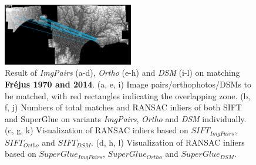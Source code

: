 \begin{figure}[htbp]
\begin{center}
{\begin{minipage}[t]{0.48\linewidth}
				\centering
				\includegraphics[width=5.7cm]{images/Chapitre3/Homol-SIFT2Step-Rough-2DRANSAC_MEC-Malt_Tapas_1970_MEC-Malt_2014.png}
			\end{minipage}%
		}
		\caption{Result of \textit{ImgPairs} (a-d), \textit{Ortho} (e-h) and \textit{DSM} (i-l) on matching \textbf{Fr{\'e}jus 1970 and 2014}. (a, e, i) Image pairs/orthophotos/\ac{DSM}s to be matched, with red rectangles indicating the overlapping zone. (b, f, j) Numbers of total matches and RANSAC inliers of both SIFT and SuperGlue on variants \textit{ImgPairs}, \textit{Ortho} and \textit{DSM} individually. (c, g, k) Visualization of RANSAC inliers based on $SIFT_{ImgPairs}$, $SIFT_{Ortho}$ and $SIFT_{DSM}$. (d, h, l) Visualization of RANSAC inliers based on $SuperGlue_{ImgPairs}$, $SuperGlue_{Ortho}$ and $SuperGlue_{DSM}$.}
		\label{MatchVizFrejus1970DSM}
	\end{center}
\end{figure} 


